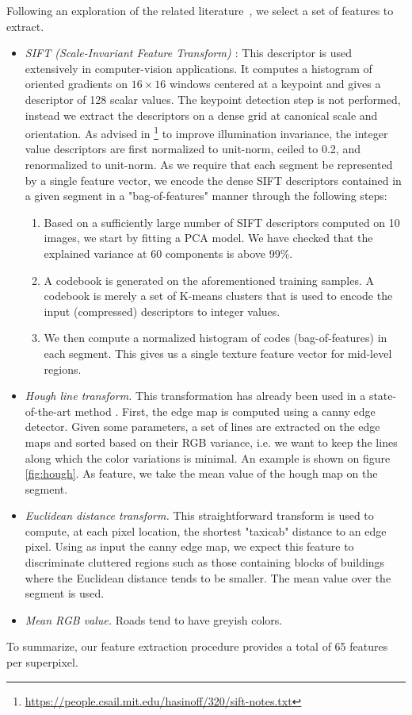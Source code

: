 \documentclass[10pt,conference,compsocconf]{IEEEtran}
\begin{document}
Following an exploration of the related literature~\cite{fulkerson09}, we select a set of features to extract.
\begin{itemize}
\item\emph{SIFT (Scale-Invariant Feature Transform) \cite{lowe04}}: This descriptor is used extensively in computer-vision applications. It computes a histogram of oriented gradients on $16 \times 16$ windows centered at a keypoint and gives a descriptor of 128 scalar values. The keypoint detection step is not performed, instead we extract the descriptors on a dense grid at canonical scale and orientation. As advised in \footnote{\url{https://people.csail.mit.edu/hasinoff/320/sift-notes.txt}}
 to improve illumination invariance, the integer value descriptors are first normalized to unit-norm, ceiled to 0.2, and renormalized to unit-norm. As we require that each segment be represented by a single feature vector, we encode the dense SIFT descriptors contained in a given segment in a "bag-of-features" manner through the following steps: 
\begin{enumerate}
\item Based on a sufficiently large number of SIFT descriptors computed on 10 images, we start by fitting a PCA model. We have checked that the explained variance at 60 components is above 99\%.
\item A codebook is generated on the aforementioned training samples. A codebook is merely a set of K-means clusters that is used to encode the input (compressed) descriptors to integer values.
\item We then compute a normalized histogram of codes (bag-of-features) in each segment. This gives us a single texture feature vector for mid-level regions.
\end{enumerate}
\item \emph{Hough line transform.} This transformation has already been used in a state-of-the-art method \cite{2016ISPAr41B3..891L}. First, the edge map is computed using a canny edge detector\cite{canny1986computational}. Given some parameters, a set of lines are extracted on the edge maps and sorted based on their RGB variance, i.e. we want to keep the lines along which the color variations is minimal. An example is shown on figure \ref{fig:hough}. As feature, we take the mean value of the hough map on the segment.
\item \emph{Euclidean distance transform.} This straightforward transform is used to compute, at each pixel location, the shortest "taxicab"\cite{taxicab} distance to an edge pixel. Using as input the canny edge map, we expect this feature to discriminate cluttered regions such as those containing blocks of buildings where the Euclidean distance tends to be smaller. The mean value over the segment is used.
\item \emph{Mean RGB value.} Roads tend to have greyish colors.
\end{itemize}
To summarize, our feature extraction procedure provides a total of 65 features
per superpixel.
\end{document}

